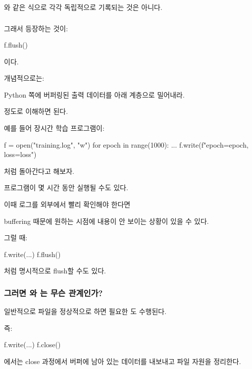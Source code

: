 와 같은 식으로 각각 독립적으로 기록되는 것은 아니다.

\subsubsection{}

그래서 등장하는 것이:

\begin{dhkcode}
f.flush()
\end{dhkcode}

이다.

개념적으로는:

\begin{dhksmry}[centered]
Python 쪽에 버퍼링된 출력 데이터를 아래 계층으로 밀어내라.
\end{dhksmry}

정도로 이해하면 된다.

예를 들어 장시간 학습 프로그램이:

\begin{dhkcode}
f = open("training.log", "w")
for epoch in range(1000):
    ...
    f.write(f"epoch={epoch}, loss={loss}\n")
\end{dhkcode}

처럼 돌아간다고 해보자.

프로그램이 몇 시간 동안 실행될 수도 있다.

이때 로그를 외부에서 빨리 확인해야 한다면

buffering 때문에 원하는 시점에 내용이 안 보이는 상황이 있을 수 있다.

그럴 때:

\begin{dhkcode}
f.write(...)
f.flush()
\end{dhkcode}

처럼 명시적으로 flush할 수도 있다.

\subsubsection{그러면 와 는 무슨 관계인가?}

일반적으로 파일을 정상적으로 하면 필요한 도 수행된다.

즉:

\begin{dhkcode}
f.write(...)
f.close()
\end{dhkcode}

에서는 close 과정에서 버퍼에 남아 있는 데이터를 내보내고 파일 자원을 정리한다.

